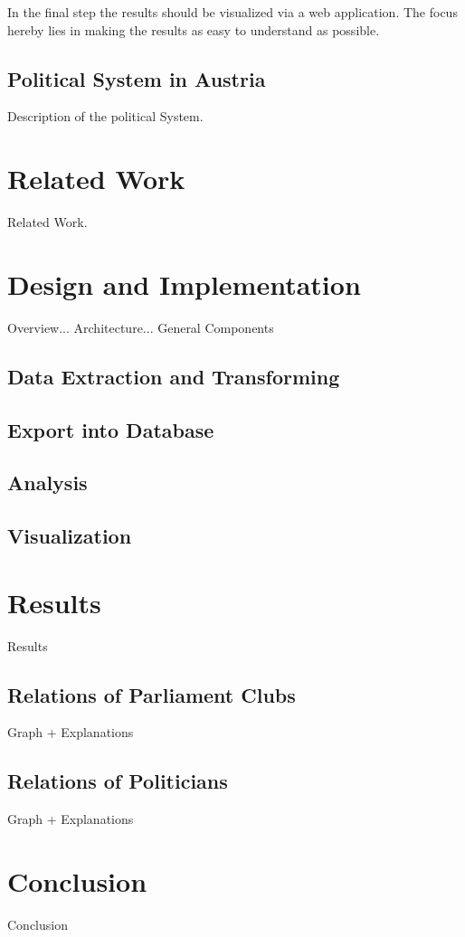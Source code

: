 \documentclass[12pt]{report}
\begin{document}
In the final step the results should be visualized via a web application. The focus hereby lies in making the results as easy to understand as possible.

\section{Political System in Austria}
Description of the political System.

\chapter{Related Work}
Related Work.

\chapter{Design and Implementation}

Overview... Architecture... General Components

\section{Data Extraction and Transforming}

\section{Export into Database}

\section{Analysis}

\section{Visualization}

\chapter{Results}
Results

\section{Relations of Parliament Clubs}
Graph + Explanations

\section{Relations of Politicians}
Graph + Explanations

\chapter{Conclusion}
Conclusion

 

\end{document}
